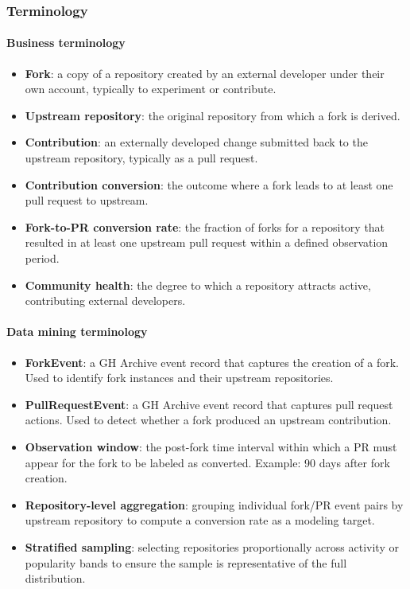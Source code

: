 \subsubsection{Terminology}
\paragraph{Business terminology}
\begin{itemize}
  \item \textbf{Fork}: a copy of a repository created by an external developer under their own account, typically to experiment or contribute.
  \item \textbf{Upstream repository}: the original repository from which a fork is derived.
  \item \textbf{Contribution}: an externally developed change submitted back to the upstream repository, typically as a pull request.
  \item \textbf{Contribution conversion}: the outcome where a fork leads to at least one pull request to upstream.
  \item \textbf{Fork-to-PR conversion rate}: the fraction of forks for a repository that resulted in at least one upstream pull request within a defined observation period.
  \item \textbf{Community health}: the degree to which a repository attracts active, contributing external developers.
\end{itemize}

\paragraph{Data mining terminology}
\begin{itemize}
  \item \textbf{ForkEvent}: a GH Archive event record that captures the creation of a fork. Used to identify fork instances and their upstream repositories.
  \item \textbf{PullRequestEvent}: a GH Archive event record that captures pull request actions. Used to detect whether a fork produced an upstream contribution.
  \item \textbf{Observation window}: the post-fork time interval within which a PR must appear for the fork to be labeled as converted. Example: 90 days after fork creation.
  \item \textbf{Repository-level aggregation}: grouping individual fork/PR event pairs by upstream repository to compute a conversion rate as a modeling target.
  \item \textbf{Stratified sampling}: selecting repositories proportionally across activity or popularity bands to ensure the sample is representative of the full distribution.
\end{itemize}

